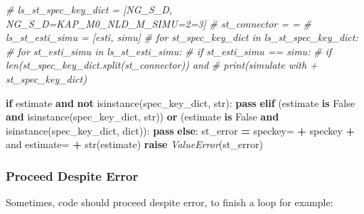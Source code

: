 \documentclass[
]{book}
\newenvironment{Shaded}{\begin{snugshade}}{\end{snugshade}}
\newcommand{\BuiltInTok}[1]{#1}
\newcommand{\CommentTok}[1]{\textcolor[rgb]{0.56,0.35,0.01}{\textit{#1}}}
\newcommand{\ControlFlowTok}[1]{\textcolor[rgb]{0.13,0.29,0.53}{\textbf{#1}}}
\newcommand{\KeywordTok}[1]{\textcolor[rgb]{0.13,0.29,0.53}{\textbf{#1}}}
\newcommand{\NormalTok}[1]{#1}
\newcommand{\OperatorTok}[1]{\textcolor[rgb]{0.81,0.36,0.00}{\textbf{#1}}}
\newcommand{\PreprocessorTok}[1]{\textcolor[rgb]{0.56,0.35,0.01}{\textit{#1}}}
\newcommand{\StringTok}[1]{\textcolor[rgb]{0.31,0.60,0.02}{#1}}
\newcommand{\VariableTok}[1]{\textcolor[rgb]{0.00,0.00,0.00}{#1}}
\begin{document}
\begin{Shaded}
\begin{Highlighting}[]
\CommentTok{\# ls\_st\_spec\_key\_dict = [\textquotesingle{}NG\_S\_D\textquotesingle{}, \textquotesingle{}NG\_S\_D=KAP\_M0\_NLD\_M\_SIMU=2=3\textquotesingle{}]}
\CommentTok{\# st\_connector = \textquotesingle{}=\textquotesingle{}}
\CommentTok{\# ls\_st\_esti\_simu = [\textquotesingle{}esti\textquotesingle{}, \textquotesingle{}simu\textquotesingle{}]}
\CommentTok{\# for st\_spec\_key\_dict in ls\_st\_spec\_key\_dict:}
\CommentTok{\#   for st\_esti\_simu in ls\_st\_esti\_simu:}
\CommentTok{\#     if st\_esti\_simu == \textquotesingle{}simu\textquotesingle{}:}
\CommentTok{\#       if len(st\_spec\_key\_dict.split(st\_connector)) and}
\CommentTok{\#         print(\textquotesingle{}simulate with \textquotesingle{} + st\_spec\_key\_dict)}

\ControlFlowTok{if}\NormalTok{ estimate }\KeywordTok{and} \KeywordTok{not} \BuiltInTok{isinstance}\NormalTok{(spec\_key\_dict, }\BuiltInTok{str}\NormalTok{):}
    \ControlFlowTok{pass}
\ControlFlowTok{elif}\NormalTok{ (estimate }\KeywordTok{is} \VariableTok{False} \KeywordTok{and} \BuiltInTok{isinstance}\NormalTok{(spec\_key\_dict, }\BuiltInTok{str}\NormalTok{)) }\KeywordTok{or}\NormalTok{ (estimate }\KeywordTok{is} \VariableTok{False} \KeywordTok{and} \BuiltInTok{isinstance}\NormalTok{(spec\_key\_dict, }\BuiltInTok{dict}\NormalTok{)):}
    \ControlFlowTok{pass}
\ControlFlowTok{else}\NormalTok{:}
\NormalTok{    st\_error }\OperatorTok{=} \StringTok{\textquotesingle{}speckey=\textquotesingle{}} \OperatorTok{+}\NormalTok{ speckey }\OperatorTok{+} \StringTok{\textquotesingle{} and estimate=\textquotesingle{}} \OperatorTok{+} \BuiltInTok{str}\NormalTok{(estimate)}
    \ControlFlowTok{raise} \PreprocessorTok{ValueError}\NormalTok{(st\_error)}
\end{Highlighting}
\end{Shaded}

\hypertarget{proceed-despite-error}{%
\subsubsection{Proceed Despite Error}\label{proceed-despite-error}}

Sometimes, code should proceed despite error, to finish a loop for example:
\end{document}
